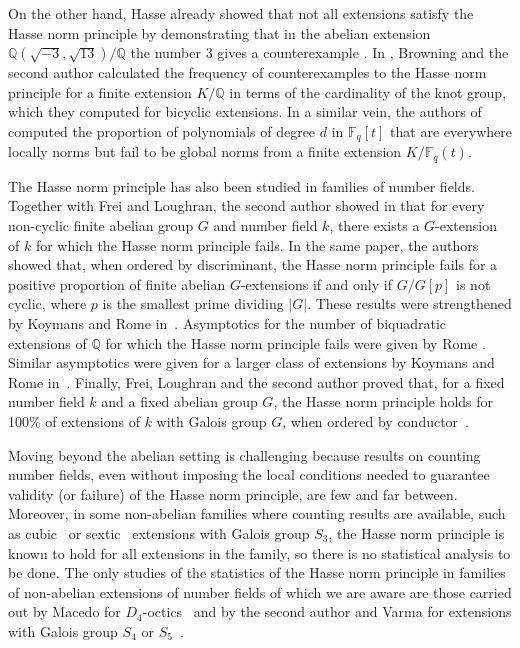 \documentclass{amsart}
\numberwithin{equation}{section} \numberwithin{figure}{section}
\newcommand\QQ{\mathbb{Q}}
\theoremstyle{one}
\theoremstyle{definition}
\begin{document}
On the other hand, Hasse already showed that not all extensions satisfy the Hasse norm principle by demonstrating that in the abelian extension $\mathbb{Q}(\sqrt{-3},\sqrt{13})/\QQ$ the number $3$ gives a counterexample \cite{has:31}. In \cite{bro.new:16}, Browning and the second author calculated the frequency of counterexamples
to the Hasse norm principle for a finite extension $K/\mathbb{Q}$ in terms of the cardinality of the knot group, which they computed for bicyclic extensions. In a similar vein, the authors of \cite{man.new.ozm.ea:21} computed the proportion of polynomials of degree $d$ in $\mathbb{F}_q[t]$ that are everywhere locally norms but fail to be global
norms from a finite extension $K/\mathbb{F}_q(t)$.

The Hasse norm principle has also been studied in families of number fields. Together with Frei and Loughran, the second author showed in \cite{fre.lou.new:18} that for every non-cyclic finite abelian group $G$ and number field $k$, there exists a $G$-extension of $k$ for which the Hasse norm principle fails. In the same paper, the authors showed that, when ordered by discriminant, the Hasse norm principle fails for a positive proportion of finite abelian $G$-extensions if and only if $G/G[p]$ is not cyclic, where $p$ is the smallest prime dividing $|G|$. These results were strengthened by Koymans and Rome in~\cite{koy.rom:24b}. Asymptotics for the number of biquadratic extensions of $\mathbb{Q}$ for which the Hasse norm principle fails were given by Rome \cite{rom:18}. Similar asymptotics were given for a larger class of extensions by Koymans and Rome in~\cite{koy.rom:24a}. 
Finally, Frei, Loughran and the second author proved that, for a fixed number field $k$ and a fixed abelian group $G$, the Hasse norm principle holds for 100\% of extensions of $k$ with Galois group $G$, when ordered by conductor~\cite{fre.lou.new:22}.


Moving beyond the abelian setting is challenging because results on counting number fields, even without imposing the local conditions needed to guarantee validity (or failure) of the Hasse norm principle, are few and far between. Moreover, in some non-abelian families where counting results are available, such as cubic~\cite{dav.heil:71, dat.wri:88, sha.tho:24} or sextic~\cite{bha.woo.08} extensions with Galois group $S_3$, the Hasse norm principle is known to hold for all extensions in the family, so there is no statistical analysis to be done. 
The only studies of the statistics of the Hasse norm principle in families of non-abelian extensions of number fields of which we are aware are those carried out by Macedo for $D_4$-octics~\cite{macedoPhD:21} and by the second author and Varma for extensions with Galois group $S_4$ or $S_5$~\cite{nv:}. 
\end{document}
